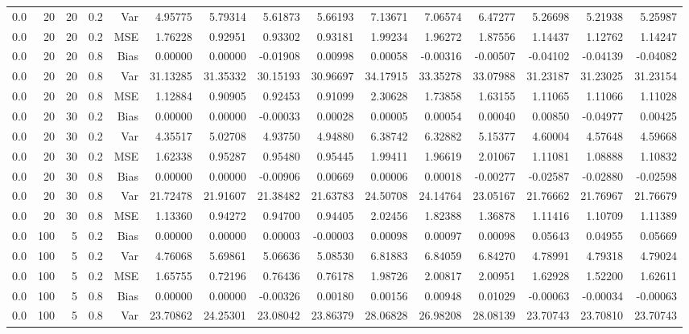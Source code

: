 \begin{table}[!htbp]
\begin{tabular}{lrrrrrrrrrrrrrr}
0.0 &  20 & 20 & 0.2 & Var & 4.95775 & 5.79314 & 5.61873 & 5.66193 & 7.13671 & 7.06574 & 6.47277 & 5.26698 & 5.21938 & 5.25987 \\
0.0 &  20 & 20 & 0.2 & MSE & 1.76228 & 0.92951 & 0.93302 & 0.93181 & 1.99234 & 1.96272 & 1.87556 & 1.14437 & 1.12762 & 1.14247 \\
0.0 &  20 & 20 & 0.8 & Bias & 0.00000 & 0.00000 & -0.01908 & 0.00998 & 0.00058 & -0.00316 & -0.00507 & -0.04102 & -0.04139 & -0.04082 \\
0.0 &  20 & 20 & 0.8 & Var & 31.13285 & 31.35332 & 30.15193 & 30.96697 & 34.17915 & 33.35278 & 33.07988 & 31.23187 & 31.23025 & 31.23154 \\
0.0 &  20 & 20 & 0.8 & MSE & 1.12884 & 0.90905 & 0.92453 & 0.91099 & 2.30628 & 1.73858 & 1.63155 & 1.11065 & 1.11066 & 1.11028 \\
0.0 &  20 & 30 & 0.2 & Bias & 0.00000 & 0.00000 & -0.00033 & 0.00028 & 0.00005 & 0.00054 & 0.00040 & 0.00850 & -0.04977 & 0.00425 \\
0.0 &  20 & 30 & 0.2 & Var & 4.35517 & 5.02708 & 4.93750 & 4.94880 & 6.38742 & 6.32882 & 5.15377 & 4.60004 & 4.57648 & 4.59668 \\
0.0 &  20 & 30 & 0.2 & MSE & 1.62338 & 0.95287 & 0.95480 & 0.95445 & 1.99411 & 1.96619 & 2.01067 & 1.11081 & 1.08888 & 1.10832 \\
0.0 &  20 & 30 & 0.8 & Bias & 0.00000 & 0.00000 & -0.00906 & 0.00669 & 0.00006 & 0.00018 & -0.00277 & -0.02587 & -0.02880 & -0.02598 \\
0.0 &  20 & 30 & 0.8 & Var & 21.72478 & 21.91607 & 21.38482 & 21.63783 & 24.50708 & 24.14764 & 23.05167 & 21.76662 & 21.76967 & 21.76679 \\
0.0 &  20 & 30 & 0.8 & MSE & 1.13360 & 0.94272 & 0.94700 & 0.94405 & 2.02456 & 1.82388 & 1.36878 & 1.11416 & 1.10709 & 1.11389 \\
0.0 & 100 &  5 & 0.2 & Bias & 0.00000 & 0.00000 & 0.00003 & -0.00003 & 0.00098 & 0.00097 & 0.00098 & 0.05643 & 0.04955 & 0.05669 \\
0.0 & 100 &  5 & 0.2 & Var & 4.76068 & 5.69861 & 5.06636 & 5.08530 & 6.81883 & 6.84059 & 6.84270 & 4.78991 & 4.79318 & 4.79024 \\
0.0 & 100 &  5 & 0.2 & MSE & 1.65755 & 0.72196 & 0.76436 & 0.76178 & 1.98726 & 2.00817 & 2.00951 & 1.62928 & 1.52200 & 1.62611 \\
0.0 & 100 &  5 & 0.8 & Bias & 0.00000 & 0.00000 & -0.00326 & 0.00180 & 0.00156 & 0.00948 & 0.01029 & -0.00063 & -0.00034 & -0.00063 \\
0.0 & 100 &  5 & 0.8 & Var & 23.70862 & 24.25301 & 23.08042 & 23.86379 & 28.06828 & 26.98208 & 28.08139 & 23.70743 & 23.70810 & 23.70743 \\

\end{tabular}
\end{table}
